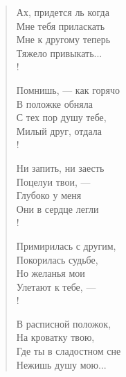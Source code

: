 \newpage
\vspace*{0cm}

\begin{verse}
\begin{altverse}
Ах, придется ль когда\\
   Мне тебя приласкать\ldotsq\\
Мне к другому теперь\\
   Тяжело привыкать...\\!

Помнишь, --- как горячо\\
    В положке обняла\ldotsq\\
С тех пор душу тебе,\\
    Милый друг, отдала\ldotst\\!

Ни запить, ни заесть\\
    Поцелуи твои, ---\\
Глубоко у меня\\
    Они в сердце легли\ldotst\\!

Примирилась с другим,\\
    Покорилась судьбе,\\
Но желанья мои\\
    Улетают к тебе, ---\\!

В расписной положок,\\
    На кроватку твою,\\
Где ты в сладостном сне\\
    Нежишь душу мою...
\end{altverse}
\end{verse}

\newpage
\vspace*{0cm}

